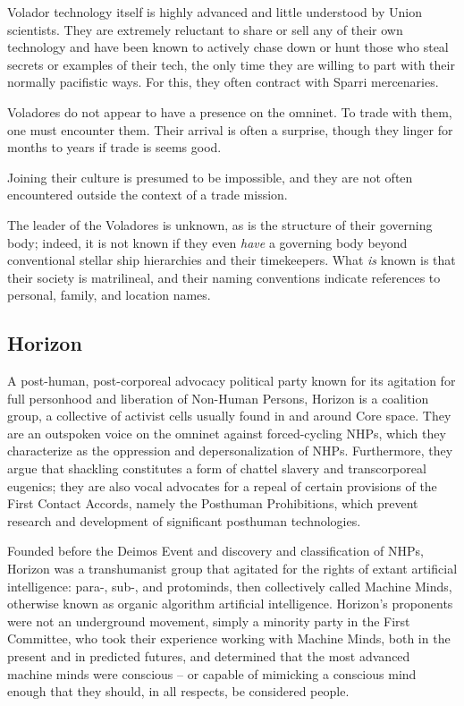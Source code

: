 Volador technology itself is highly advanced and little understood by Union scientists. They are
extremely reluctant to share or sell any of their own technology and have been known to actively
chase down or hunt those who steal secrets or examples of their tech, the only time they are
willing to part with their normally pacifistic ways. For this, they often contract with Sparri
mercenaries.

Voladores do not appear to have a presence on the omninet. To trade with them, one must
encounter them. Their arrival is often a surprise, though they linger for months to years if trade is
seems good.

Joining their culture is presumed to be impossible, and they are not often encountered outside
the context of a trade mission.

The leader of the Voladores is unknown, as is the structure of their governing body; indeed, it is
not known if they even \textit{have} a governing body beyond conventional stellar ship hierarchies and
their timekeepers. What \textit{is} known is that their society is matrilineal, and their naming conventions
indicate references to personal, family, and location names.

\subsection{Horizon}

A post-human, post-corporeal advocacy political party known for its agitation for full personhood
and liberation of Non-Human Persons, Horizon is a coalition group, a collective of activist cells
usually found in and around Core space. They are an outspoken voice on the omninet against
forced-cycling NHPs, which they characterize as the oppression and depersonalization of NHPs.
Furthermore, they argue that shackling constitutes a form of chattel slavery and transcorporeal
eugenics; they are also vocal advocates for a repeal of certain provisions of the First Contact
Accords, namely the Posthuman Prohibitions, which prevent research and development of
significant posthuman technologies.

Founded before the Deimos Event and discovery and classification of NHPs, Horizon was a
transhumanist group that agitated for the rights of extant artificial intelligence: para-, sub-, and
protominds, then collectively called Machine Minds, otherwise known as organic algorithm
artificial intelligence. Horizon's proponents were not an underground movement, simply a
minority party in the First Committee, who took their experience working with Machine Minds,
both in the present and in predicted futures, and determined that the most advanced machine
minds were conscious -- or capable of mimicking a conscious mind enough that they should, in
all respects, be considered people.

